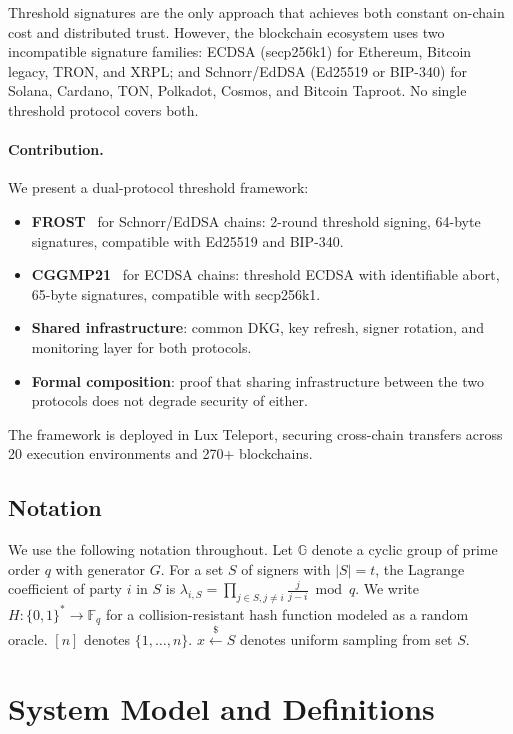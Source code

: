 \documentclass[11pt,twocolumn]{article}
\begin{document}
Threshold signatures are the only approach that achieves both constant on-chain cost
and distributed trust. However, the blockchain ecosystem uses two incompatible
signature families: ECDSA (secp256k1) for Ethereum, Bitcoin legacy, TRON, and XRPL;
and Schnorr/EdDSA (Ed25519 or BIP-340) for Solana, Cardano, TON, Polkadot, Cosmos,
and Bitcoin Taproot. No single threshold protocol covers both.

\paragraph{Contribution.} We present a dual-protocol threshold framework:

\begin{itemize}[nosep]
  \item \textbf{FROST}~\cite{komlo2020frost} for Schnorr/EdDSA chains: 2-round
    threshold signing, 64-byte signatures, compatible with Ed25519 and BIP-340.
  \item \textbf{CGGMP21}~\cite{canetti2021cggmp} for ECDSA chains: threshold ECDSA
    with identifiable abort, 65-byte signatures, compatible with secp256k1.
  \item \textbf{Shared infrastructure}: common DKG, key refresh, signer rotation,
    and monitoring layer for both protocols.
  \item \textbf{Formal composition}: proof that sharing infrastructure between the
    two protocols does not degrade security of either.
\end{itemize}

The framework is deployed in Lux Teleport, securing cross-chain transfers across
20 execution environments and 270+ blockchains.

\subsection{Notation}

We use the following notation throughout. Let $\mathbb{G}$ denote a cyclic group of
prime order $q$ with generator $G$. For a set $S$ of signers with $|S| = t$, the
Lagrange coefficient of party $i$ in $S$ is $\lambda_{i,S} = \prod_{j \in S, j \neq i}
\frac{j}{j - i} \bmod q$. We write $H : \{0,1\}^* \to \mathbb{F}_q$ for a
collision-resistant hash function modeled as a random oracle. $[n]$ denotes
$\{1, \ldots, n\}$. $x \xleftarrow{\$} S$ denotes uniform sampling from set $S$.

\section{System Model and Definitions}
\label{sec:model}
\end{document}
